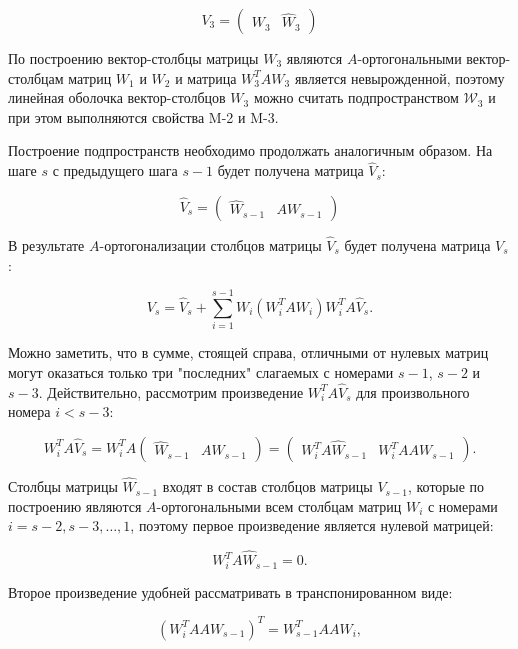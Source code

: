 $$
	V_3 =
		\begin{pmatrix}
			W_3 & \widehat{W}_3
		\end{pmatrix}
$$

По построению вектор-столбцы матрицы $W_3$ являются $A$-ортогональными вектор-столбцам матриц $W_1$ и $W_2$ и матрица $W_3^T A W_3$
является невырожденной, поэтому линейная оболочка вектор-столбцов $W_3$ можно считать подпространством $\mathcal W_3$ и при этом выполняются
свойства M-2 и M-3.

Построение подпространств необходимо продолжать аналогичным образом. На шаге $s$ с предыдущего шага $s-1$ будет получена матрица
$\widehat{V}_s$:

$$
	\widehat{V}_s =
		\begin{pmatrix}
			\widehat{W}_{s-1} & A W_{s-1}
		\end{pmatrix}
$$

В результате $A$-ортогонализации столбцов матрицы $\widehat{V}_s$ будет получена матрица $V_s$:

\begin{equation} \label{equation:ti:nhs:fs:V_s_orthogonalization}
	V_s = \widehat{V}_s + \sum_{i=1}^{s-1} W_i \left ( W_i^T A W_i \right ) W_i^T A \widehat{V}_s.
\end{equation}

Можно заметить, что в сумме, стоящей справа, отличными от нулевых матриц могут оказаться только три "последних"{} слагаемых
с номерами $s-1$, $s-2$ и $s-3$. Действительно, рассмотрим произведение $W_i^T A \widehat{V}_s$ для произвольного номера $i < s-3$:

$$
	W_i^T A \widehat{V}_s
		= W_i^T A \begin{pmatrix} \widehat{W}_{s-1} & A W_{s-1} \end{pmatrix}
		= \begin{pmatrix} W_i^T A \widehat{W}_{s-1} & W_i^T A A W_{s-1} \end{pmatrix}.
$$

Столбцы матрицы $\widehat{W}_{s-1}$ входят в состав столбцов матрицы $V_{s-1}$, которые по построению являются $A$-ортогональными всем
столбцам матриц $W_i$ с номерами $i = s-2, s-3, \dots, 1$, поэтому первое произведение является нулевой матрицей:

$$
	W_i^T A \widehat{W}_{s-1} = 0.
$$

Второе произведение удобней рассматривать в транспонированном виде:

$$
	\left ( W_i^T A A W_{s-1} \right ) ^T = W_{s-1}^T A A W_i,
$$

